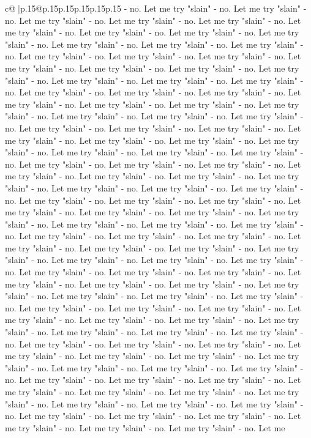 \documentclass{article}
\begin{document}
{\begin{supertabular}{c@{$\;$}|p{.15\linewidth}@{}p{.15\linewidth}p{.15\linewidth}p{.15\linewidth}p{.15\linewidth}p{.15\linewidth}}
{{{{-} no. Let me try "slain" {-} no. Let me try "slain" {-} no. Let me try "slain" {-} no. Let me try "slain" {-} no. Let me try "slain" {-} no. Let me try "slain" {-} no. Let me try "slain" {-} no. Let me try "slain" {-} no. Let me try "slain" {-} no. Let me try "slain" {-} no. Let me try "slain" {-} no. Let me try "slain" {-} no. Let me try "slain" {-} no. Let me try "slain" {-} no. Let me try "slain" {-} no. Let me try "slain" {-} no. Let me try "slain" {-} no. Let me try "slain" {-} no. Let me try "slain" {-} no. Let me try "slain" {-} no. Let me try "slain" {-} no. Let me try "slain" {-} no. Let me try "slain" {-} no. Let me try "slain" {-} no. Let me try "slain" {-} no. Let me try "slain" {-} no. Let me try "slain" {-} no. Let me try "slain" {-} no. Let me try "slain" {-} no. Let me try "slain" {-} no. Let me try "slain" {-} no. Let me try "slain" {-} no. Let me try "slain" {-} no. Let me try "slain" {-} no. Let me try "slain" {-} no. Let me try "slain" {-} no. Let me try "slain" {-} no. Let me try "slain" {-} no. Let me try "slain" {-} no. Let me try "slain" {-} no. Let me try "slain" {-} no. Let me try "slain" {-} no. Let me try "slain" {-} no. Let me try "slain" {-} no. Let me try "slain" {-} no. Let me try "slain" {-} no. Let me try "slain" {-} no. Let me try "slain" {-} no. Let me try "slain" {-} no. Let me try "slain" {-} no. Let me try "slain" {-} no. Let me try "slain" {-} no. Let me try "slain" {-} no. Let me try "slain" {-} no. Let me try "slain" {-} no. Let me try "slain" {-} no. Let me try "slain" {-} no. Let me try "slain" {-} no. Let me try "slain" {-} no. Let me try "slain" {-} no. Let me try "slain" {-} no. Let me try "slain" {-} no. Let me try "slain" {-} no. Let me try "slain" {-} no. Let me try "slain" {-} no. Let me try "slain" {-} no. Let me try "slain" {-} no. Let me try "slain" {-} no. Let me try "slain" {-} no. Let me try "slain" {-} no. Let me try "slain" {-} no. Let me try "slain" {-} no. Let me try "slain" {-} no. Let me try "slain" {-} no. Let me try "slain" {-} no. Let me try "slain" {-} no. Let me try "slain" {-} no. Let me try "slain" {-} no. Let me try "slain" {-} no. Let me try "slain" {-} no. Let me try "slain" {-} no. Let me try "slain" {-} no. Let me try "slain" {-} no. Let me try "slain" {-} no. Let me try "slain" {-} no. Let me try "slain" {-} no. Let me try "slain" {-} no. Let me try "slain" {-} no. Let me try "slain" {-} no. Let me try "slain" {-} no. Let me try "slain" {-} no. Let me try "slain" {-} no. Let me try "slain" {-} no. Let me try "slain" {-} no. Let me try "slain" {-} no. Let me try "slain" {-} no. Let me try "slain" {-} no. Let me try "slain" {-} no. Let me try "slain" {-} no. Let me try "slain" {-} no. Let me try "slain" {-} no. Let me try "slain" {-} no. Let me try "slain" {-} no. Let me try "slain" {-} no. Let me try "slain" {-} no. Let me try "slain" {-} no. Let me try "slain" {-} no. Let me try "slain" {-} no. Let me try "slain" {-} no. Let me try "slain" {-} no. Let me try "slain" {-} no. Let me try "slain" {-} no. Let me try "slain" {-} no. Let me try "slain" {-} no. Let me try "slain" {-} no. Let me try "slain" {-} no. Let me try "slain" {-} no. Let me try "slain" {-} no. Let me }}}
\end{supertabular}}
\end{document}
